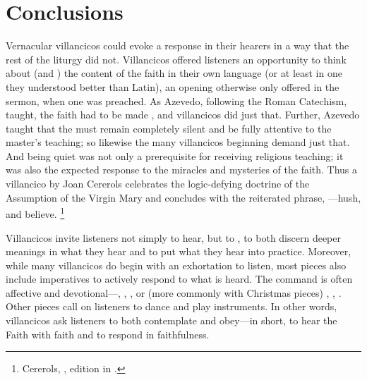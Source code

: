 \section{%
Conclusions
}

Vernacular villancicos could evoke a response in their hearers in a way that the rest of the liturgy did not.
Villancicos offered listeners an opportunity to think about (and ) the content of the faith in their own language (or at least in one they understood better than Latin), an opening otherwise only offered in the sermon, when one was preached.
As Azevedo, following the Roman Catechism, taught, the faith had to be made , and villancicos did just that.
Further, Azevedo taught that the  must remain completely silent and be fully attentive to the master's teaching; so likewise the many villancicos beginning  demand just that.
And being quiet was not only a prerequisite for receiving religious teaching; it was also the expected response to the miracles and mysteries of the faith. 
Thus a villancico by Joan Cererols celebrates the logic-defying doctrine of the Assumption of the Virgin Mary and concludes with the reiterated phrase, ---hush, and believe.%
	\footnote{%
	Cererols, , edition in \autocite{Cererols:MEM-VC}. %
	}

Villancicos invite listeners not simply to hear, but to , to both discern deeper meanings in what they hear and to put what they hear into practice.
Moreover, while many villancicos do begin with an exhortation to listen, most pieces also include imperatives to actively respond to what is heard.
The command is often affective and devotional---, ,  , or (more commonly with Christmas pieces) , ,  .
Other pieces call on listeners to dance and play instruments.
In other words, villancicos ask listeners to both contemplate and obey---in short, to hear the Faith with faith and to respond in faithfulness. 

